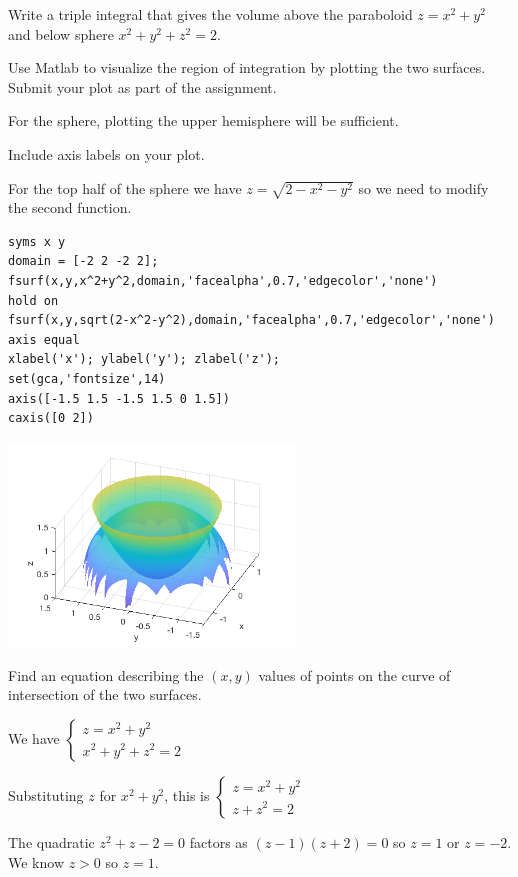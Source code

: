 \documentclass[12pt,letterpaper,noanswers]{exam}
\begin{document}
\begin{questions}
\item Write a triple integral that gives the volume above the paraboloid $z=x^2+y^2$ and below sphere $x^2+y^2+z^2=2$. 
\begin{parts}
\item Use Matlab to visualize the region of integration by plotting the two surfaces.  Submit your plot as part of the assignment.

For the sphere, plotting the upper hemisphere will be sufficient.  

Include axis labels on your plot.
\begin{solution}
For the top half of the sphere we have $z = \sqrt{2-x^2-y^2}$ so we need to modify the second function.
\begin{verbatim}
syms x y
domain = [-2 2 -2 2];
fsurf(x,y,x^2+y^2,domain,'facealpha',0.7,'edgecolor','none')
hold on
fsurf(x,y,sqrt(2-x^2-y^2),domain,'facealpha',0.7,'edgecolor','none')
axis equal
xlabel('x'); ylabel('y'); zlabel('z');
set(gca,'fontsize',14)
axis([-1.5 1.5 -1.5 1.5 0 1.5])
caxis([0 2])
\end{verbatim}

\includegraphics[width=3in]{img/pset07-p1-18.png}
\end{solution}
\item Find an equation describing the $(x,y)$ values of points on the curve of intersection of the two surfaces.
\begin{solution}
We have 
$\left\{\begin{array}{c} z = x^2+y^2 \\ x^2+y^2+z^2 = 2\end{array}\right.$

Substituting $z$ for $x^2+y^2$, this is
$\left\{\begin{array}{c} z = x^2+y^2 \\ z+z^2 = 2\end{array}\right.$

The quadratic $z^2+z-2=0$ factors as $(z-1)(z+2) = 0$ so $z =1$ or $z=-2$.  We know $z>0$ so $z = 1$.


\end{solution}
\end{parts}
\end{questions}
\end{document}
